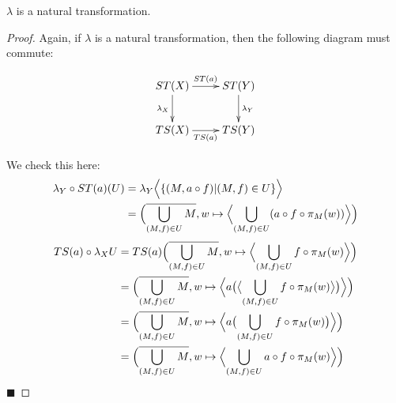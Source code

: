 \begin{proposition}
$\lambda$ is a natural transformation.
\end{proposition}
\begin{proof}
Again, if $\lambda$ is a natural transformation, then the following diagram must commute:

\[
\xymatrix{
ST(X)\ar[r]^{ST(a)}\ar[d]_{\lambda_X} & ST(Y)\ar[d]^{\lambda_Y} \\
TS(X)\ar[r]_{TS(a)} &TS(Y)
}
\]

We check this here:
\begin{align*}
\lambda_Y\circ ST(a)(U) &= \lambda_Y \Bigl\langle\{(M,a\circ f)|(M,f)\in U\}\Bigr\rangle \\
&= \Bigl(\overline{\bigcup_{(M,f)\in U} M}, w\mapsto\Bigl\langle\bigcup_{(M,f)\in U} (a\circ f\circ \pi_M(w))\Bigr\rangle\Bigr)
\end{align*}
\begin{align*}
TS(a)\circ \lambda_X U &= TS(a) \Bigl(\overline{\bigcup_{(M,f)\in U} M}, w\mapsto \Bigl\langle\bigcup_{(M,f)\in U} f\circ \pi_M(w)\Bigr\rangle\Bigr) \\
&= \Bigl(\overline{\bigcup_{(M,f)\in U} M}, w\mapsto\Bigl\langle a\bigl(\bigl\langle\bigcup_{(M,f)\in U} f\circ \pi_M(w)\bigr\rangle\bigr)\Bigr\rangle\Bigr) \\
&= \Bigl(\overline{\bigcup_{(M,f)\in U} M}, w\mapsto\Bigl\langle a\bigl(\bigcup_{(M,f)\in U} f\circ \pi_M(w)\bigr)\Bigr\rangle\Bigr) \\
&= \Bigl(\overline{\bigcup_{(M,f)\in U} M}, w\mapsto\Bigl\langle \bigcup_{(M,f)\in U} a\circ f\circ \pi_M(w)\Bigr\rangle\Bigr) \\
\end{align*}\hfill $\blacksquare$
\end{proof}

